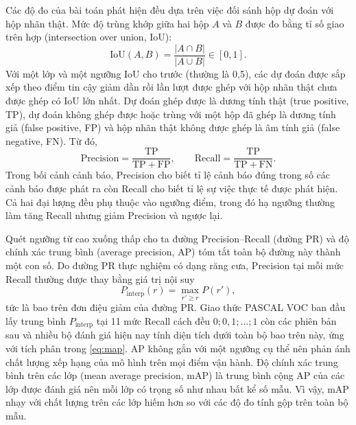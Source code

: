 Các độ đo của bài toán phát hiện đều dựa trên việc đối sánh hộp dự đoán với hộp nhãn thật. Mức độ trùng khớp giữa hai hộp $A$ và $B$ được đo bằng tỉ số giao trên hợp (intersection over union, IoU):
\begin{equation}
\mathrm{IoU}(A, B) = \frac{|A \cap B|}{|A \cup B|} \in [0, 1].
\label{eq:iou}
\end{equation}
Với một lớp và một ngưỡng IoU cho trước (thường là 0,5), các dự đoán được sắp xếp theo điểm tin cậy giảm dần rồi lần lượt được ghép với hộp nhãn thật chưa được ghép có IoU lớn nhất. Dự đoán ghép được là dương tính thật (true positive, TP), dự đoán không ghép được hoặc trùng với một hộp đã ghép là dương tính giả (false positive, FP) và hộp nhãn thật không được ghép là âm tính giả (false negative, FN). Từ đó,
\begin{equation}
\mathrm{Precision} = \frac{\mathrm{TP}}{\mathrm{TP} + \mathrm{FP}}, \qquad
\mathrm{Recall} = \frac{\mathrm{TP}}{\mathrm{TP} + \mathrm{FN}}.
\label{eq:pr}
\end{equation}
Trong bối cảnh cảnh báo, Precision cho biết tỉ lệ cảnh báo đúng trong số các cảnh báo được phát ra còn Recall cho biết tỉ lệ sự việc thực tế được phát hiện. Cả hai đại lượng đều phụ thuộc vào ngưỡng điểm, trong đó hạ ngưỡng thường làm tăng Recall nhưng giảm Precision và ngược lại.

Quét ngưỡng từ cao xuống thấp cho ta đường Precision--Recall (đường PR) và độ chính xác trung bình (average precision, AP) tóm tắt toàn bộ đường này thành một con số. Do đường PR thực nghiệm có dạng răng cưa, Precision tại mỗi mức Recall thường được thay bằng giá trị nội suy
\begin{equation}
P_{\text{interp}}(r) = \max_{r' \geq r} P(r'),
\label{eq:interp}
\end{equation}
tức là bao trên đơn điệu giảm của đường PR. Giao thức PASCAL VOC \cite{everingham2010pascal} ban đầu lấy trung bình $P_{\text{interp}}$ tại 11 mức Recall cách đều $0; 0{,}1; \dots; 1$ còn các phiên bản sau và nhiều bộ đánh giá hiện nay tính diện tích dưới toàn bộ bao trên này, ứng với tích phân trong \cref{eq:map}. AP không gắn với một ngưỡng cụ thể nên phản ánh chất lượng xếp hạng của mô hình trên mọi điểm vận hành. Độ chính xác trung bình trên các lớp (mean average precision, mAP) là trung bình cộng AP của các lớp được đánh giá nên mỗi lớp có trọng số như nhau bất kể số mẫu. Vì vậy, mAP nhạy với chất lượng trên các lớp hiếm hơn so với các độ đo tính gộp trên toàn bộ mẫu.

